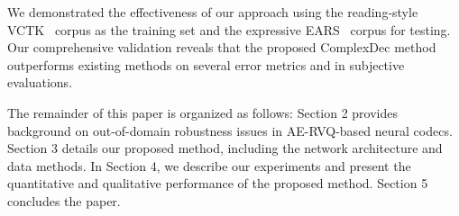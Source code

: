 We demonstrated the effectiveness of our approach using the reading-style VCTK~\cite{vctk2017} corpus as the training set and the expressive EARS~\cite{ears} corpus for testing. Our comprehensive validation reveals that the proposed ComplexDec method outperforms existing methods on several error metrics and in subjective evaluations.

The remainder of this paper is organized as follows: Section 2 provides background on out-of-domain robustness issues in AE-RVQ-based neural codecs. Section 3 details our proposed method, including the network architecture and data methods. In Section 4, we describe our experiments and present the quantitative and qualitative performance of the proposed method. Section 5 concludes the paper.

